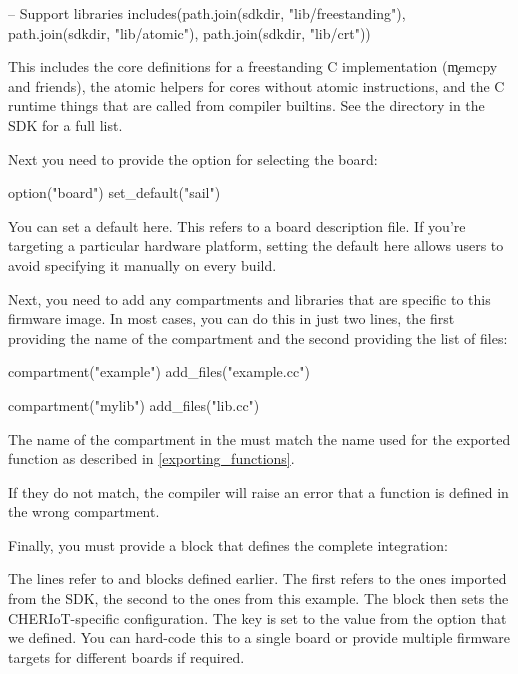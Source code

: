 \begin{luasnippet}
-- Support libraries
includes(path.join(sdkdir, "lib/freestanding"),
         path.join(sdkdir, "lib/atomic"),
         path.join(sdkdir, "lib/crt"))
\end{luasnippet}

This includes the core definitions for a freestanding C implementation (\c{memcpy} and friends), the atomic helpers for cores without atomic instructions, and the C runtime things that are called from compiler builtins.
See the  directory in the SDK for a full list.

Next you need to provide the option for selecting the board:

\begin{luasnippet}
option("board")
    set_default("sail")
\end{luasnippet}

You can set a default here.
This refers to a board description file.
If you're targeting a particular hardware platform, setting the default here allows users to avoid specifying it manually on every build.

Next, you need to add any compartments and libraries that are specific to this firmware image.
In most cases, you can do this in just two lines, the first providing the name of the compartment and the second providing the list of files:

\begin{luasnippet}
compartment("example")
    add_files("example.cc")

compartment("mylib")
    add_files("lib.cc")
\end{luasnippet}

\begin{caution}
	The name of the compartment in the  must match the name used for the exported function as described in \ref{exporting_functions}.
\end{caution}
If they do not match, the compiler will raise an error that a function is defined in the wrong compartment.

Finally, you must provide a  block that defines the complete integration:

\lualisting[filename=../rtos-source/examples/01.hello_world/xmake.lua,firstline=20,lastline=34]{}

The  lines refer to  and  blocks defined earlier.
The first refers to the ones imported from the SDK, the second to the ones from this example.
The  block then sets the CHERIoT-specific configuration.
The  key is set to the value from the option that we defined.
You can hard-code this to a single board or provide multiple firmware targets for different boards if required.

